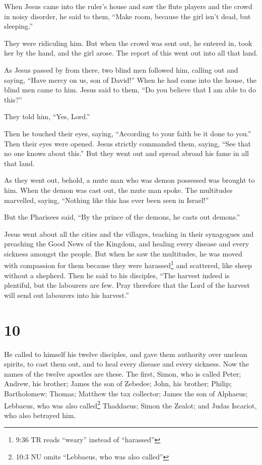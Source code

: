  When Jesus came into the ruler's house and saw the flute
players and the crowd in noisy disorder,  he said to them,
``Make room, because the girl isn't dead, but sleeping.''

They were ridiculing him.  But when the crowd was sent out,
he entered in, took her by the hand, and the girl arose. 
The report of this went out into all that land.

 As Jesus passed by from there, two blind men followed him,
calling out and saying, ``Have mercy on us, son of David!''
 When he had come into the house, the blind men came to
him. Jesus said to them, ``Do you believe that I am able to do this?''

They told him, ``Yes, Lord.''

 Then he touched their eyes, saying, ``According to your
faith be it done to you.''  Then their eyes were opened.
Jesus strictly commanded them, saying, ``See that no one knows about
this.''  But they went out and spread abroad his fame in
all that land.

 As they went out, behold, a mute man who was demon
possessed was brought to him.  When the demon was cast out,
the mute man spoke. The multitudes marvelled, saying, ``Nothing like
this has ever been seen in Israel!''

 But the Pharisees said, ``By the prince of the demons, he
casts out demons.''

 Jesus went about all the cities and the villages, teaching
in their synagogues and preaching the Good News of the Kingdom, and
healing every disease and every sickness amongst the people.
 But when he saw the multitudes, he was moved with
compassion for them because they were harassed\footnote{9:36 TR reads
  ``weary'' instead of ``harassed''} and scattered, like sheep without a
shepherd.  Then he said to his disciples, ``The harvest
indeed is plentiful, but the labourers are few.  Pray
therefore that the Lord of the harvest will send out labourers into his
harvest.''

\hypertarget{section-9}{%
\section{10}\label{section-9}}

 He called to himself his twelve disciples, and gave them
authority over unclean spirits, to cast them out, and to heal every
disease and every sickness.  Now the names of the twelve
apostles are these. The first, Simon, who is called Peter; Andrew, his
brother; James the son of Zebedee; John, his brother; 
Philip; Bartholomew; Thomas; Matthew the tax collector; James the son of
Alphaeus; Lebbaeus, who was also called\footnote{10:3 NU omits
  ``Lebbaeus, who was also called''} Thaddaeus;  Simon the
Zealot; and Judas Iscariot, who also betrayed him.

